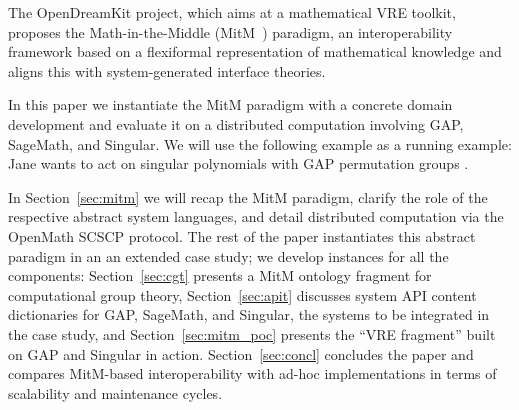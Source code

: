 The OpenDreamKit project, which aims at a mathematical VRE toolkit, proposes the Math-in-the-Middle (MitM~\cite{DehKohKon:iop16}) paradigm, an interoperability framework based on a flexiformal
representation of mathematical knowledge and aligns this with system-generated interface theories. 

In this paper we instantiate the MitM paradigm with a concrete domain
development and evaluate it on a distributed computation involving GAP, SageMath, and Singular.
We will use the following example as a running example: Jane wants to act on singular polynomials with GAP permutation groups
.

In Section~\ref{sec:mitm} we will recap the MitM paradigm, clarify the role of the respective abstract system languages, and  detail distributed computation via the OpenMath SCSCP protocol.
The rest of the paper instantiates this abstract paradigm in an an extended case study; we develop instances for all the components: Section~\ref{sec:cgt} presents a MitM ontology fragment for computational group theory, Section~\ref{sec:apit} discusses system API content dictionaries for GAP, SageMath, and Singular, the systems to be integrated in the case study, and Section~\ref{sec:mitm_poc} presents the ``VRE fragment'' built on GAP and Singular in action. 
Section~\ref{sec:concl} concludes the paper and compares MitM-based interoperability with ad-hoc implementations in terms of scalability and maintenance cycles. 


